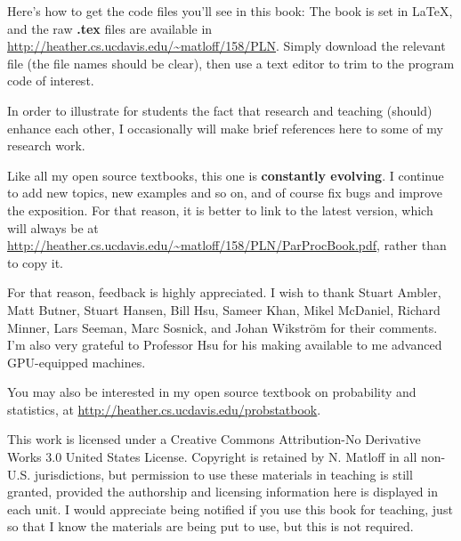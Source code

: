 Here's how to get the code files you'll see in this book: The book is
set in LaTeX, and the raw {\bf .tex} files are available in
\url{http://heather.cs.ucdavis.edu/~matloff/158/PLN}.  Simply download
the relevant file (the file names should be clear), then use a text
editor to trim to the program code of interest.

In order to illustrate for students the fact that research and teaching
(should) enhance each other, I occasionally will make brief references
here to some of my research work.

Like all my open source textbooks, this one is {\bf constantly
evolving}.  I continue to add new topics, new examples and so on, and of
course fix bugs and improve the exposition.  For that reason, it is
better to link to the latest version, which will always be at
\url{http://heather.cs.ucdavis.edu/~matloff/158/PLN/ParProcBook.pdf},
rather than to copy it. 

For that reason, feedback is highly appreciated.  I wish to thank Stuart
Ambler, Matt Butner, Stuart Hansen, Bill Hsu, Sameer Khan, Mikel
McDaniel, Richard Minner, Lars Seeman, Marc Sosnick,
and Johan Wikstr{\"o}m for their
comments.  I'm also very grateful to Professor Hsu for his making
available to me advanced GPU-equipped machines.

You may also be interested in my open source textbook on probability and
statistics, at \url{http://heather.cs.ucdavis.edu/probstatbook}.

This work is licensed under a Creative Commons Attribution-No Derivative
Works 3.0 United States License. Copyright is retained by N. Matloff in
all non-U.S. jurisdictions, but permission to use these materials in
teaching is still granted, provided the authorship and licensing
information here is displayed in each unit. I would appreciate being
notified if you use this book for teaching, just so that I know the
materials are being put to use, but this is not required.

